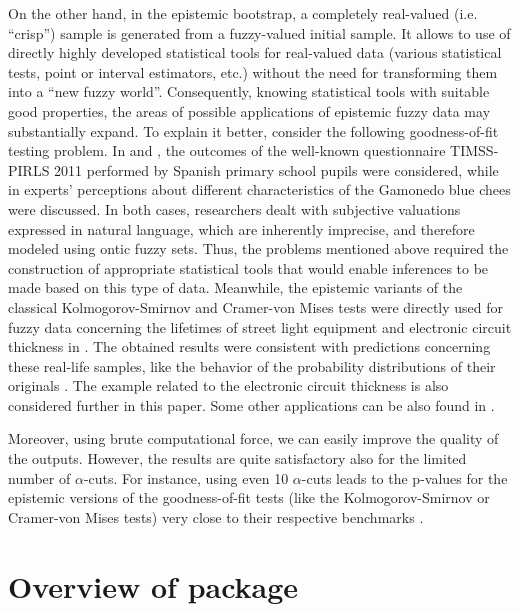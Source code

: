 On the other hand, in the epistemic bootstrap, a completely real-valued (i.e. ``crisp'') sample is generated from a fuzzy-valued initial sample.
It allows to use of directly highly developed statistical tools for real-valued data (various statistical tests, point or interval estimators, etc.) without the need for transforming them into a ``new fuzzy world''.
Consequently, knowing statistical tools with suitable good properties, the areas of possible applications of epistemic fuzzy data may substantially expand.
To explain it better, consider the following goodness-of-fit testing problem. In \cite{LUBIANO2016918} and \cite{lubiano2017}, the outcomes of the well-known questionnaire TIMSS-PIRLS 2011 performed by Spanish primary school pupils were considered, while in  \cite{Ramos-Guajardo2019} experts' perceptions about different characteristics of the Gamonedo blue chees were discussed. In both cases, researchers dealt with subjective valuations expressed in natural language, which are inherently imprecise, and therefore modeled using ontic fuzzy sets. Thus, the problems mentioned above required the construction of appropriate statistical tools that would enable inferences to be made based on this type of data.
Meanwhile, the epistemic variants of the classical Kolmogorov-Smirnov and Cramer-von Mises tests were directly used for fuzzy data concerning the lifetimes of street light equipment \citep{Hesamian2013} and electronic circuit thickness \citep{FARAZ20102684} in \cite{PGMR2024AMS}.
The obtained results were consistent with predictions concerning these real-life samples, like the behavior of the probability distributions of their originals \citep{Gibbons2010}.
The example related to the electronic circuit thickness is also considered further in this paper.
Some other applications can be also found in \citep{10.1007/978-3-031-08974-9_39,pgmr2022,GrzegorzewskiRom2021,PGMR2024AMS}.

Moreover, using brute computational force, we can easily improve the quality of the outputs.
However, the results are quite satisfactory also for the limited number of $\alpha$-cuts.
For instance, using even 10 $\alpha$-cuts leads to the p-values for the epistemic versions of the goodness-of-fit tests (like the Kolmogorov-Smirnov or Cramer-von Mises tests) very close to their respective benchmarks \citep{PGMR2024AMS}.




\section{Overview of  package}
\label{overview}


